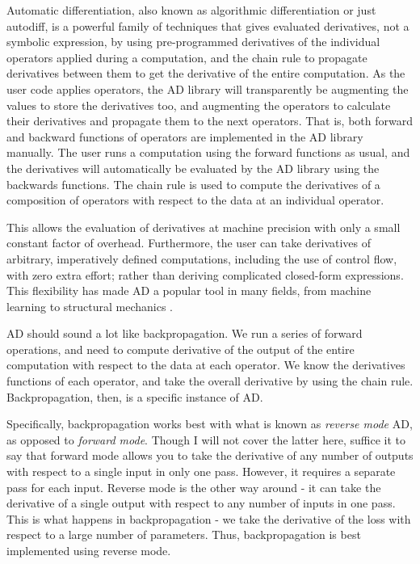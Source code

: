 Automatic differentiation, also known as algorithmic differentiation or just autodiff,
is a powerful family of techniques that gives evaluated derivatives, not a symbolic expression, by using pre-programmed derivatives of the individual operators applied during a computation, and the chain rule to propagate derivatives between them to get the derivative of the entire computation.
As the user code applies operators, the AD library will transparently be augmenting the values to store the derivatives too, and augmenting the operators to calculate their derivatives and propagate them to the next operators.
That is, both forward and backward functions of operators are implemented in the AD library manually.
The user runs a computation using the forward functions as usual, and the derivatives will automatically be evaluated by the AD library using the backwards functions.
The chain rule is used to compute the derivatives of a composition of operators with respect to the data at an individual operator.

This allows the evaluation of derivatives at machine precision with only a small constant factor of overhead.
Furthermore, the user can take derivatives of arbitrary, imperatively defined computations, including the use of control flow, with zero extra effort; rather than deriving complicated closed-form expressions.
This flexibility has made AD a popular tool in many fields, from machine learning to structural mechanics \cite{Haase2002}.

AD should sound a lot like backpropagation.
We run a series of forward operations, and need to compute derivative of the output of the entire computation with respect to the data at each operator. We know the derivatives functions of each operator, and take the overall derivative by using the chain rule. Backpropagation, then, is a specific instance of AD.

Specifically, backpropagation works best with what is known as \textit{reverse mode} AD, as opposed to \textit{forward mode}.
Though I will not cover the latter here, suffice it to say that forward mode allows you to take the derivative of any number of outputs with respect to a single input in only one pass.
However, it requires a separate pass for each input.
Reverse mode is the other way around -
it can take the derivative of a single output with respect to any number of inputs in one pass.
This is what happens in backpropagation -
we take the derivative of the loss with respect to a large number of parameters.
Thus, backpropagation is best implemented using reverse mode.

